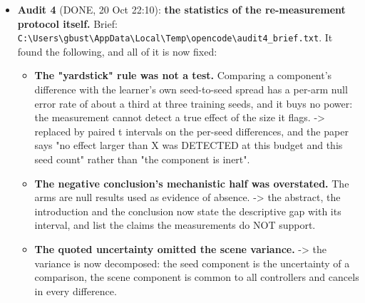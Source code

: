 \documentclass[11pt,a4paper]{article}
\begin{document}
\begin{itemize}[leftmargin=1.15em,itemsep=4pt,topsep=2pt,label={\color{uavblue}\scriptsize\textbullet}]
\begin{itemize}[leftmargin=1.25em,itemsep=1.5pt,topsep=2pt,label={\color{uavmuted}\scriptsize\textendash}]
\item \textbf{The framework's contribution needed a measurement.} On the report's own infeasible N=5 configuration the reactive heuristic still reaches CK 0.648 with full connectivity while the joint metric is 0.000 and the oracle reaches 0.990: neither metric alone distinguishes the instance from a feasible one, and it is the certificate that makes the reading decidable. Measured by \texttt{analysis/\allowbreak{}infeasible\_instance.py}, audit item I1.
\item \textbf{The rule's privileged access was an untested alternative explanation.} Now measured: \texttt{analysis/\allowbreak{}infeasible\_instance.py} aside, the arm \texttt{Reactive (local assignment)} in \texttt{train.py} runs the same rule without the global coverage state, and the verdict is derived from the measurement in the token filler.
\end{itemize}
\item \textbf{Audit 4} (DONE, 20 Oct 22:10): \textbf{the statistics of the re-measurement protocol itself.} Brief: \texttt{C:\textbackslash{}\allowbreak{}Users\textbackslash{}\allowbreak{}gbust\textbackslash{}\allowbreak{}AppData\textbackslash{}\allowbreak{}Local\textbackslash{}\allowbreak{}Temp\textbackslash{}\allowbreak{}opencode\textbackslash{}\allowbreak{}audit4\_brief.txt}. It found the following, and all of it is now fixed:
\begin{itemize}[leftmargin=1.25em,itemsep=1.5pt,topsep=2pt,label={\color{uavmuted}\scriptsize\textendash}]
\item \textbf{The "yardstick" rule was not a test.} Comparing a component's difference with the learner's own seed-to-seed spread has a per-arm null error rate of about a third at three training seeds, and it buys no power: the measurement cannot detect a true effect of the size it flags. -> replaced by paired t intervals on the per-seed differences, and the paper says "no effect larger than X was DETECTED at this budget and this seed count" rather than "the component is inert".
\item \textbf{The negative conclusion's mechanistic half was overstated.} The arms are null results used as evidence of absence. -> the abstract, the introduction and the conclusion now state the descriptive gap with its interval, and list the claims the measurements do NOT support.
\item \textbf{The quoted uncertainty omitted the scene variance.} -> the variance is now decomposed: the seed component is the uncertainty of a comparison, the scene component is common to all controllers and cancels in every difference.

\end{itemize}
\end{itemize}
\end{document}
